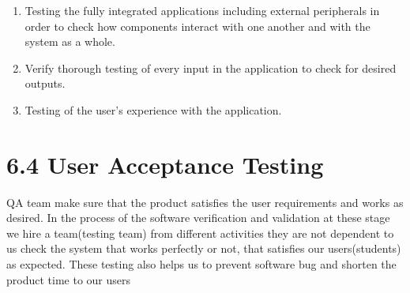 \documentclass{standalone}
\begin{document}
\begin{enumerate}

\item Testing the fully integrated applications including external peripherals in order to check how components interact with one another and with the system as a whole.
\item Verify thorough testing of every input in the application to check for desired outputs.
\item Testing of the user's experience with the application. \vspace{0.7cm}

\end{enumerate}
\section*{6.4\hspace{0.3 cm} User Acceptance Testing}
 \vspace{0.3cm}

\hspace{0.5cm} QA team make sure that the product satisfies the user requirements and works as desired. In the process of the software verification and validation at these stage we hire a team(testing team) from different activities they are not dependent to us check the system that works perfectly or not, that satisfies our users(students) as expected. These testing also helps us to prevent software bug and shorten the product time to our users
\end{document}
